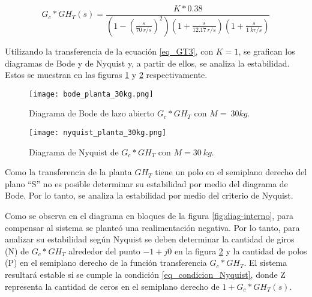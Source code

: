 \begin{equation} \label{eq_GT3}
	G_c*GH_T(s)=\frac{K*0.38}{(1-(\frac{s}{70\:r/s})^2)(1+\frac{s}{12.17\:r/s })(1+\frac{s}{1\:kr/s}) }	
\end{equation}

Utilizando la transferencia de la ecuación \ref{eq_GT3}, con $K=1$, se  grafican los diagramas de Bode y de Nyquist y, a partir de ellos, se analiza la estabilidad. Estos se muestran en las figuras \ref{fig:Diag_Bode_lazo_abierto_30kg} y \ref{fig:Diag_Nyquist_lazo_abierto_30kg} respectivamente.

\begin{figure}[H]
	\centering
	\texttt{[image: bode\_planta\_30kg.png]}
	\caption{Diagrama de Bode de lazo abierto $G_c*GH_T$ con $M=\:30 kg$.}
	\label{fig:Diag_Bode_lazo_abierto_30kg}
\end{figure}

\begin{figure}[H]
	\centering
	\texttt{[image: nyquist\_planta\_30kg.png]}
	\caption{Diagrama de Nyquist de $G_c*GH_T$ con $M=30\:kg$.}
	\label{fig:Diag_Nyquist_lazo_abierto_30kg}
\end{figure}



Como la transferencia de la planta $GH_T$ tiene un polo en el semiplano derecho del plano ``S'' no es posible determinar su estabilidad por medio del diagrama de Bode. Por lo tanto, se analiza la estabilidad por medio del criterio de Nyquist.

Como se observa en el diagrama en bloques de la figura \ref{fig:diag-interno}, para compensar al sistema se planteó una realimentación negativa. Por lo tanto, para analizar su estabilidad según Nyquist se deben determinar la cantidad de giros (N) de $G_c*GH_T$ alrededor del punto $-1+j0$ en la figura \ref{fig:Diag_Nyquist_lazo_abierto_30kg} y la cantidad de polos (P) en el semiplano derecho de la función transferencia $G_c*GH_T$. El sistema resultará estable si se cumple la condición \ref{eq_condicion_Nyquist}, donde Z representa la cantidad de ceros en el semiplano derecho de $1+G_c*GH_T(s)$.

